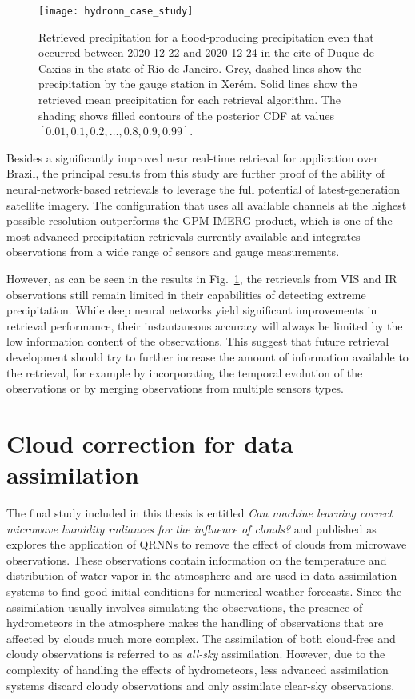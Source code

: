 \begin{figure}
  \centering
  \texttt{[image: hydronn\_case\_study]}
  \caption{
      Retrieved precipitation for a flood-producing precipitation even that
      occurred between 2020-12-22 and 2020-12-24 in the cite of Duque de Caxias
      in the state of Rio de Janeiro. Grey, dashed lines show the precipitation
      by the gauge station in Xer\'em. Solid lines show the retrieved mean
      precipitation for each retrieval algorithm. The shading shows filled
      contours of the posterior CDF at values $[0.01, 0.1, 0.2, \ldots, 0.8,
        0.9, 0.99]$.
    }
  \label{fig:contributions:hydronn_case_study}
\end{figure}

Besides a significantly improved near real-time retrieval for application over
Brazil, the principal results from this study are further proof of the ability
of neural-network-based retrievals to leverage the full potential of
latest-generation satellite imagery. The configuration that uses all available
channels at the highest possible resolution outperforms the GPM IMERG product,
which is one of the most advanced precipitation retrievals currently available
and integrates observations from a wide range of sensors and gauge measurements.

However, as can be seen in the results in
Fig.~\ref{fig:contributions:hydronn_case_study}, the retrievals from VIS and IR
observations still remain limited in their capabilities of detecting extreme
precipitation. While deep neural networks yield significant improvements in
retrieval performance, their instantaneous accuracy will always be limited by
the low information content of the observations. This suggest that future
retrieval development should try to further increase the amount of information
available to the retrieval, for example by incorporating the temporal evolution
of the observations or by merging observations from multiple sensors types.

\section{Cloud correction for data assimilation}

The final study included in this thesis is entitled
\textit{
  Can machine learning correct microwave humidity radiances for the influence of clouds?
  }
and published as \citet{kaur21} explores the application of QRNNs to remove the
effect of clouds from microwave observations. These observations contain
information on the temperature and distribution of water vapor in the atmosphere
and are used in data assimilation systems to find good initial conditions for
numerical weather forecasts. Since the assimilation usually involves simulating
the observations, the presence of hydrometeors in the atmosphere makes the
handling of observations that are affected by clouds much more complex. The
assimilation of both cloud-free and cloudy observations is referred to
as \textit{all-sky} assimilation. However, due to the complexity of handling the effects
of hydrometeors, less advanced assimilation systems discard cloudy observations
and only assimilate clear-sky observations.

